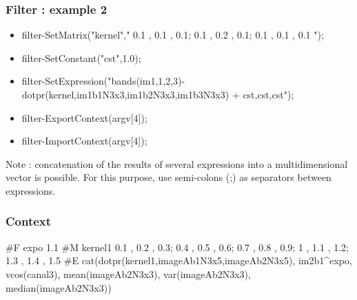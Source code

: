 \documentclass[8pt]{beamer}
\begin{document}
\begin{frame}
\frametitle{Filter : example 2}


\begin{itemize}
\item filter-\>SetMatrix("kernel","{ 0.1 , 0.1 , 0.1; 0.1 , 0.2 , 0.1; 0.1 , 0.1 , 0.1 }");
\item filter-\>SetConstant("cst",1.0);
\item filter-\>SetExpression("bands(im1,{1,2,3})-dotpr(kernel,im1b1N3x3,im1b2N3x3,im1b3N3x3) + {cst,cst,cst}");  
\item filter-\>ExportContext(argv[4]);
\item filter-\>ImportContext(argv[4]);
\end{itemize}

Note : concatenation of the results of several expressions into a multidimensional vector is possible.
For this purpose, use semi-colons (;) as separators between expressions.

\end{frame}




\begin{frame}
\frametitle{Context}

#F expo 1.1
#M kernel1 { 0.1 , 0.2 , 0.3; 0.4 , 0.5 , 0.6; 0.7 , 0.8 , 0.9; 1 , 1.1 , 1.2; 1.3 , 1.4 , 1.5}
#E cat(dotpr(kernel1,imageAb1N3x5,imageAb2N3x5), im2b1^expo, vcos(canal3), mean(imageAb2N3x3), var(imageAb2N3x3), median(imageAb2N3x3))

\end{frame}
\end{document}
